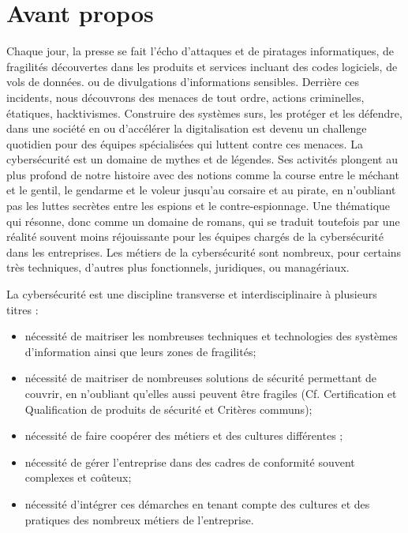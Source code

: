 
\section{Avant propos }

Chaque jour, la presse se fait l'écho d'attaques et de piratages informatiques, de fragilités découvertes dans les produits et services incluant des codes logiciels, de vols de données. ou de divulgations d'informations sensibles.
Derrière ces incidents, nous découvrons des menaces de tout ordre, actions criminelles, étatiques, hacktivismes. Construire des systèmes surs, les protéger et les défendre, dans une société en ou d'accélérer la digitalisation est devenu un challenge quotidien pour des équipes spécialisées qui luttent contre ces menaces. 
La cybersécurité est un domaine de mythes et de légendes. Ses activités plongent au plus profond de notre histoire avec des notions comme la course entre le méchant et le gentil, le gendarme et le voleur jusqu'au corsaire et au pirate, en n'oubliant pas les luttes secrètes entre les espions et le contre-espionnage. Une thématique qui résonne, donc comme un domaine de romans, qui se traduit toutefois par une réalité souvent moins réjouissante pour les équipes chargés de la cybersécurité dans les entreprises. Les métiers de la cybersécurité sont nombreux, pour certains très techniques, d'autres plus fonctionnels, juridiques, ou managériaux. 

La cybersécurité est une discipline transverse et interdisciplinaire à plusieurs titres :
\begin{itemize}
  \item nécessité de maitriser les nombreuses techniques et technologies des systèmes d'information ainsi que leurs zones de fragilités;
  \item nécessité de maitriser de nombreuses solutions de sécurité permettant de couvrir, en n'oubliant qu'elles aussi peuvent être fragiles (Cf. Certification et Qualification de produits de sécurité et Critères communs);
  \item nécessité de faire coopérer des métiers et des cultures différentes ;
  \item nécessité de gérer l'entreprise dans des cadres de conformité souvent complexes et coûteux;
  \item nécessité d'intégrer ces démarches en tenant compte des cultures et des pratiques des nombreux métiers de l'entreprise.
\end{itemize}


